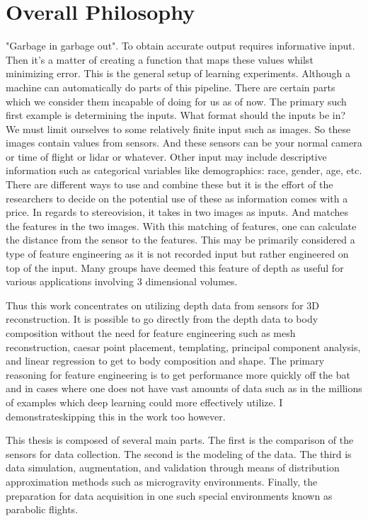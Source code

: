 \section{Overall Philosophy}
"Garbage in garbage out". To obtain accurate output requires informative input. Then it's a matter of creating a function that maps these values whilst minimizing error. 
This is the general setup of learning experiments. Although a machine can automatically do parts of this pipeline. There are certain parts which we consider them incapable of doing for us as of now. The primary such first example is determining the inputs. What format should the inputs be in? We must limit ourselves to some relatively finite input such as images. So these images contain values from sensors. And these sensors can be your normal camera or time of flight or lidar or whatever. Other input may include descriptive information such as categorical variables like demographics: race, gender, age, etc. There are different ways to use and combine these but it is the effort of the researchers to decide on the potential use of these as information comes with a price. In regards to stereovision, it takes in two images as inputs. And matches the features in the two images. With this matching of features, one can calculate the distance from the sensor to the features. This may be primarily considered a type of feature engineering as it is not recorded input but rather engineered on top of the input. Many groups have deemed this feature of depth as useful for various applications involving 3 dimensional volumes.

Thus this work concentrates on utilizing depth data from sensors for 3D reconstruction. It is possible to go directly from the depth data to body composition without the need for feature engineering such as mesh reconstruction, caesar point placement, templating, principal component analysis, and linear regression to get to body composition and shape. The primary reasoning for feature engineering is to get performance more quickly off the bat and in cases where one does not have vast amounts of data such as in the millions of examples which deep learning could more effectively utilize. I demonstrateskipping this in the work too however.

This thesis is composed of several main parts. The first is the comparison of the sensors for data collection. The second is the modeling of the data. The third is data simulation, augmentation, and validation through means of distribution approximation methods such as microgravity environments. Finally, the preparation for data acquisition in one such special environments known as parabolic flights.
